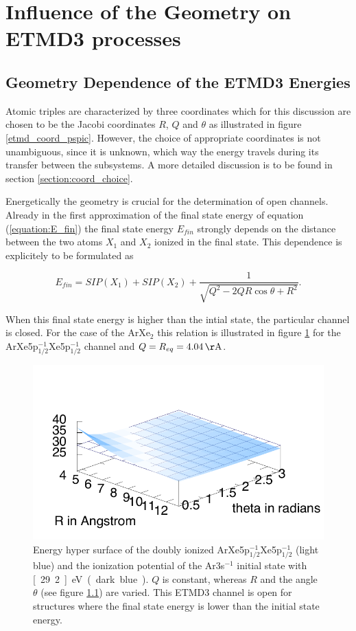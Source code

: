 \section{Influence of the Geometry on ETMD3 processes}
\subsection{Geometry Dependence of the ETMD3 Energies}
Atomic triples are characterized by three coordinates which for this
discussion are chosen to be the Jacobi coordinates
$R$, $Q$ and $\theta$ as illustrated
in figure \ref{etmd_coord_pspic}.
However, the choice of appropriate coordinates is not unambiguous,
since it is unknown, which way the energy travels during its transfer
between the subsystems. A more detailed discussion is to be found in 
section \ref{section:coord_choice}.


Energetically the geometry is crucial for the determination of open channels.
Already in the first approximation of the final state energy of equation
(\ref{equation:E_fin})
the final state energy $E_{fin}$ strongly depends on the distance between the
two atoms $X_1$ and $X_2$ ionized in the final state. This dependence is explicitely to be
formulated as

\begin{equation}
  E_{fin} = SIP(X_1) + SIP(X_2) + \frac{1}{\sqrt{Q^2 - 2QR\cos\theta + R^2}} .
\end{equation}

When this final state energy is higher than the intial state, the particular
channel is closed. For the case of the ArXe$_2$ this relation is illustrated
in figure \ref{figure:ArXe2_geom_energy} for the
ArXe5p$_{1/2}^{-1}$Xe5p$_{1/2}^{-1}$ channel and $Q=R_{eq}= \unit[4.04]{\AA}$.

\begin{figure}[htb]
 \centering
 \includegraphics[scale=0.8]{pics/ArXeXe12_12_surf.pdf}
 \caption{Energy hyper surface of the doubly ionized
          ArXe5p$_{1/2}^{-1}$Xe5p$_{1/2}^{-1}$ (light blue) and the ionization
          potential of the Ar3s$^{-1}$ initial state with \unit[29.2]{eV}
          (dark blue). $Q$ is constant, whereas $R$ and the angle $\theta$
          (see figure \ref{}) are varied. This ETMD3 channel is open for
          structures where
          the final state energy is lower than the initial state energy.}
 \label{figure:ArXe2_geom_energy}
\end{figure}


